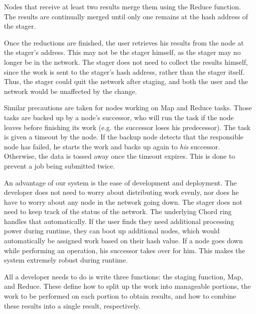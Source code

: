 \documentclass[10pt, conference, compsocconf]{IEEEtran}
\begin{document}
Nodes that receive at least two results merge them using the Reduce function.  The results are continually merged until only one remains at the hash address of the stager. 

Once the reductions are finished, the user retrieves his results from the node at the stager's address.  This may not be the stager himself, as the stager may no longer be in the network.  The stager does not need to collect the results himself, since the work is sent to the stager's hash address, rather than the stager itself.  Thus, the stager could quit the network after staging, and both the user and the network would be unaffected by the change. %

Similar precautions are taken for nodes working on Map and Reduce tasks.  Those tasks are backed up by a node's successor, who will run the task if the node leaves before finishing its work (e.g. the successor loses his predecessor).   The task is given a timeout by the node.  If the backup node detects that the responsible node has failed, he starts the work and backs up again to \emph{his} successor.  Otherwise, the data is tossed away once the timeout expires. This is done to prevent a job being submitted twice.

An advantage of our system is the ease of development and deployment.  The developer does not need to worry about distributing work evenly, nor does he have to worry about any node in the network going down.  The stager does not need to keep track of the status of the network.  The underlying Chord ring handles that automatically.  If the user finds they need additional processing power during runtime, they can boot up additional nodes, which would automatically be assigned work based on their hash value.   If a node goes down while performing an operation, his successor takes over for him.  This makes the system extremely robust during runtime.

All a developer needs to do is write three functions: the staging function, Map, and Reduce.  These define how to split up the work into manageable portions, the work to be performed on each portion to obtain results, and how to combine these results into a single result, respectively. 
\end{document}

